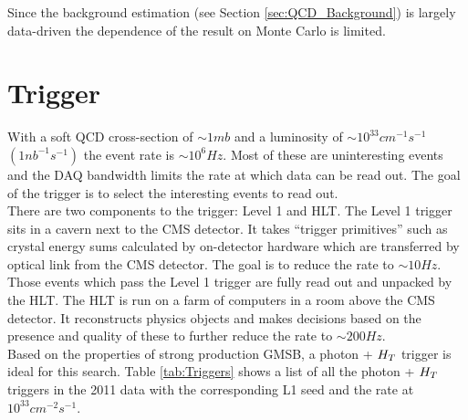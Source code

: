 
Since the background estimation (see Section \ref{sec:QCD_Background}) is 
largely data-driven the dependence of the result on Monte Carlo is limited.

\section{Trigger}

With a soft QCD cross-section of $\sim1\unit{mb}$ and a luminosity of $\sim 
10^{33}\unit{cm^{-1}s^{-1}}$ $(1\unit{nb^{-1}s^{-1}})$ the event rate is $\sim
10^{6} \unit{Hz}$. 
Most of these are uninteresting events and the DAQ bandwidth limits the rate at 
which data can be read out. The goal of the trigger is to select the interesting 
events to read out. \\

There are two components to the trigger: Level 1 and HLT. The Level 1 trigger
sits in a cavern next to the CMS detector. It takes ``trigger primitives'' such
as crystal energy sums calculated by on-detector hardware which are transferred 
by optical link from the CMS detector. The goal is to reduce the rate to $\sim 
10\unit{Hz}$. Those events which pass the Level 1 trigger are fully read out and
unpacked by the HLT. The HLT is run on a farm of computers in a room above the 
CMS detector. It reconstructs physics objects and makes decisions based on the 
presence and quality of these to further reduce the rate to $\sim 200\unit{Hz}$. \\

Based on the properties of strong production GMSB, a photon + $H_{T}$ trigger 
is ideal for this search. Table \ref{tab:Triggers} shows a list of all the 
photon + $H_{T}$ triggers in the 2011 data with the corresponding L1 seed and the
rate at $10^{33}\unit{cm^{-2}s^{-1}}$. \\


